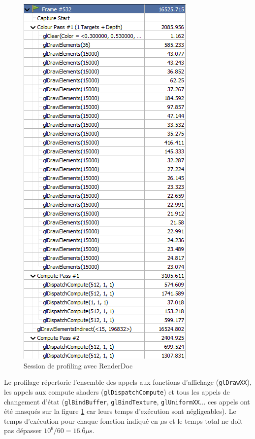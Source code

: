 \documentclass{EPUProjetDi}
\newcommand{\code}{\texttt}
\begin{document}
\begin{figure}
	\begin{center}
		\includegraphics[scale=.4]{profiling}
	\end{center}
	\caption{Session de profiling avec RenderDoc}
	\label{fig:profiling}
\end{figure}

Le profilage répertorie l'ensemble des appels aux fonctions d'affichage (\code{glDrawXX}), les appels aux compute shaders (\code{glDispatchCompute}) et tous les appels de changement d'état (\code{glBindBuffer}, \code{glBindTexture}, \code{glUniformXX}... ces appels ont été masqués sur la figure \ref{fig:profiling} car leurs temps d'exécution sont négligeables). Le temps d'exécution pour chaque fonction indiqué en $\mu$s et le temps total ne doit pas dépasser $10^6/60=16.\overline{6}\mu\text{s}$.
\end{document}
